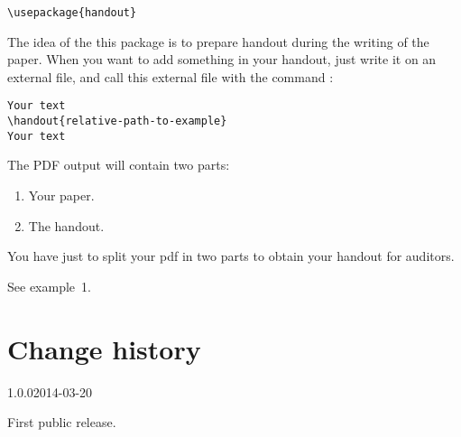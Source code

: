 \documentclass{ltxdockit}[2011/03/25]
\begin{document}
\begin{verbatim}
\usepackage{handout}
\end{verbatim}
The idea of the this package is to prepare handout during the writing of the paper. When you want to add something in your handout, just write it on an external file, and call this external file with the command  :

\begin{verbatim}
Your text
\handout{relative-path-to-example}
Your text
\end{verbatim}

The PDF output will contain two parts:
\begin{enumerate}
	\item Your paper.
	\item The handout.
\end{enumerate}

You have just to split your pdf in two parts to obtain your handout for auditors.

See example~1.

\section{Change history}


\begin{changelog}

\begin{release}{1.0.0}{2014-03-20}
\item First public release.
\end{release}
\end{changelog}
\end{document}
